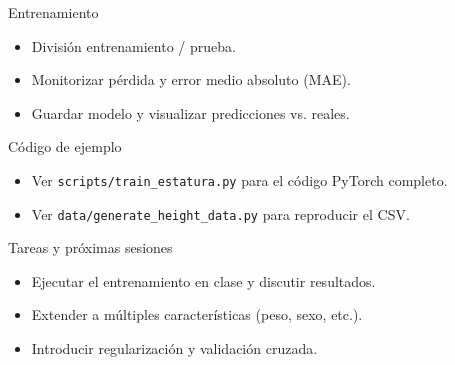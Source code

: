 \documentclass{beamer}
\begin{document}
\begin{frame}{Entrenamiento}
  \begin{itemize}
    \item División entrenamiento / prueba.
    \item Monitorizar pérdida y error medio absoluto (MAE).
    \item Guardar modelo y visualizar predicciones vs. reales.
  \end{itemize}
\end{frame}

\begin{frame}{Código de ejemplo}
  \begin{itemize}
    \item Ver \texttt{scripts/train\_estatura.py} para el código PyTorch completo.
    \item Ver \texttt{data/generate\_height\_data.py} para reproducir el CSV.
  \end{itemize}
\end{frame}

\begin{frame}{Tareas y próximas sesiones}
  \begin{itemize}
    \item Ejecutar el entrenamiento en clase y discutir resultados.
    \item Extender a múltiples características (peso, sexo, etc.).
    \item Introducir regularización y validación cruzada.
  \end{itemize}
\end{frame}
\end{document}
